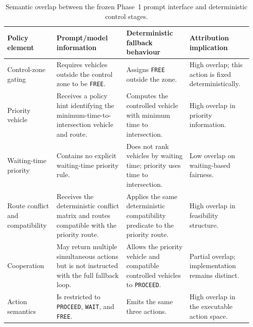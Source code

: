 \documentclass[letterpaper,10pt,conference]{ieeeconf}
\begin{document}
\begin{table}[t]

\centering

\caption{Semantic overlap between the frozen Phase~1 prompt interface and deterministic control stages.}

\label{tab:phase1_semantic_overlap}

\renewcommand{\arraystretch}{1.07}

\scriptsize

\begin{tabular}{p{1.9cm} p{3.5cm} p{3.6cm} p{3.2cm}}

\toprule

\textbf{Policy element} & \textbf{Prompt/model information} & \textbf{Deterministic fallback behaviour} & \textbf{Attribution implication} \\

\midrule

Control-zone gating & Requires vehicles outside the control zone to be \texttt{FREE}. & Assigns \texttt{FREE} outside the zone. & High overlap; this action is fixed deterministically. \\

Priority vehicle & Receives a policy hint identifying the minimum-time-to-intersection vehicle and route. & Computes the controlled vehicle with minimum time to intersection. & High overlap in priority information. \\

Waiting-time priority & Contains no explicit waiting-time priority rule. & Does not rank vehicles by waiting time; priority uses time to intersection. & Low overlap on waiting-based fairness. \\

Route conflict and compatibility & Receives the deterministic conflict matrix and routes compatible with the priority route. & Applies the same deterministic compatibility predicate to the priority route. & High overlap in feasibility structure. \\

Cooperation & May return multiple simultaneous actions but is not instructed with the full fallback loop. & Allows the priority vehicle and compatible controlled vehicles to \texttt{PROCEED}. & Partial overlap; implementation remains distinct. \\

Action semantics & Is restricted to \texttt{PROCEED}, \texttt{WAIT}, and \texttt{FREE}. & Emits the same three actions. & High overlap in the executable action space. \\


\end{tabular}
\end{table}
\end{document}
